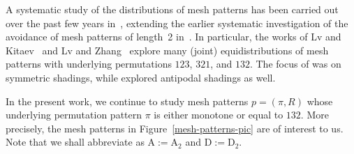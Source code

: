 \documentclass[12pt,reqno]{article}
\numberwithin{equation}{section}
\theoremstyle{plain}
\theoremstyle{definition}
\def\rA{\mathrm{A}}
\def\rD{\mathrm{D}}
\begin{document}
A systematic study of the distributions of mesh patterns has been carried out over the past few years in~\cite{KZ19,KZZ20,LK25,LZ24,LZ25}, extending the earlier systematic investigation of the avoidance of mesh patterns of length~2 in~\cite{HJS15}. In particular, the works of Lv and Kitaev~\cite{LK25} and Lv and Zhang~\cite{LZ24,LZ25} explore many (joint) equidistributions of mesh patterns with underlying permutations $123$, $321$, and $132$. The focus of \cite{LK25} was on symmetric shadings, while \cite{LZ24,LZ25} explored antipodal shadings as well.

In the present work, we continue to study mesh patterns $p=(\pi,R)$ whose underlying permutation pattern $\pi$ is either monotone or equal to $132$. More precisely, the mesh patterns in Figure~\ref{mesh-patterns-pic} are of interest to us. Note that we shall abbreviate as $\rA:=\rA_2$ and $\rD:=\rD_2$.
\end{document}
